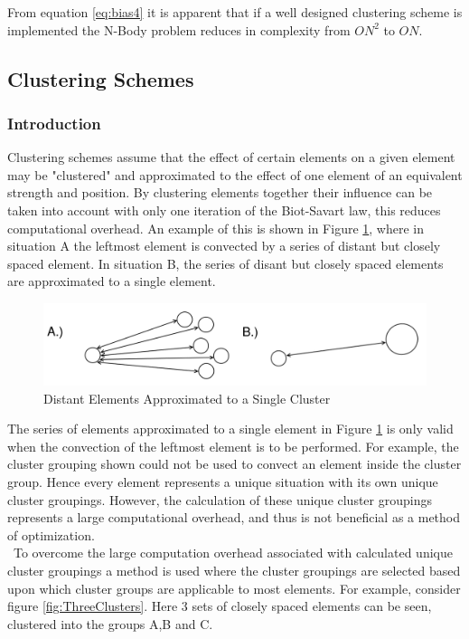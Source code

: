From equation \ref{eq:bias4} it is apparent that if a well designed clustering scheme is implemented the N-Body problem reduces in complexity from $ON^2$ to $ON$.

\subsection{Clustering Schemes}
\subsubsection{Introduction}
Clustering schemes assume that the effect of certain elements on a given element may be "clustered" and approximated to the effect of one element of an equivalent strength and position. By clustering elements together their influence can be taken into account with only one iteration of the Biot-Savart law, this reduces computational overhead. An example of this is shown in Figure \ref{fig:StoC}, where in situation A the leftmost element is convected by a series of distant but closely spaced element. In situation B, the  series of disant but closely spaced elements are approximated to a single element.

\begin{figure}[H]
\includegraphics[width=1.0\textwidth]{Figures/SeriesToCluster.png}
\caption{\label{fig:StoC}Distant Elements Approximated to a Single Cluster}
\end{figure}

The series of elements approximated to a single element in Figure \ref{fig:StoC} is only valid when the convection of the leftmost element is to be performed. For example, the cluster grouping shown could not be used to convect an element inside the cluster group. Hence every element represents a unique situation with its own unique cluster groupings. However, the calculation of these unique cluster groupings represents a large computational overhead, and thus is not beneficial as a method of optimization.
\\\
To overcome the large computation overhead associated with calculated unique cluster groupings a method is used where the cluster groupings are selected based upon which cluster groups are applicable to most elements. For example, consider figure \ref{fig:ThreeClusters}. Here 3 sets of closely spaced elements can be seen, clustered into the groups A,B and C.

